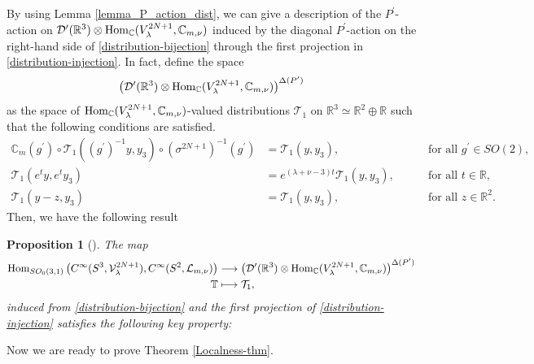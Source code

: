 \documentclass[12pt, pdflatex, a4paper]{article}
\theoremstyle{plain}
\newtheorem{prop}[thm]{Proposition}
\theoremstyle{definition}
\def\C{{\mathbb C}}
\def\Dist{\mathcal{D}^\prime}
\def\Hom{\text{\normalfont{Hom}}}
\def\L{\mathcal{L}}
\def\R{{\mathbb R}}
\def\V{\mathcal{V}}
\begin{document}
By using Lemma \ref{lemma_P_action_dist}, we can give a description of the $P^\prime$-action on $\Dist(\R^3)\otimes \Hom_\C(V_\lambda^{2N+1}, \C_{m, \nu})$ induced by the diagonal $P^\prime$-action on the right-hand side of \eqref{distribution-bijection} through the first projection in \eqref{distribution-injection}. In fact, define the space
\begin{equation*}
\left(\Dist(\R^3)\otimes \Hom_\C(V_\lambda^{2N+1}, \C_{m, \nu})\right)^{\Delta(P^\prime)}
\end{equation*}
as the space of $\Hom_\C(V_\lambda^{2N+1}, \C_{m, \nu})$-valued distributions $\mathcal{T}_1$ on $\R^3 \simeq \R^2 \oplus \R$ such that the following conditions are satisfied.
\begin{align}
\label{SO(2)-invariance}
\C_m(g^\prime) \circ \mathcal{T}_1((g^\prime)^{-1} y, y_3) \circ (\sigma^{2N+1})^{-1}(g^\prime) &=  \mathcal{T}_1(y, y_3), &&\quad \text{ for all } g^\prime \in SO(2),\\
\mathcal{T}_1(e^ty, e^ty_3) &= e^{(\lambda+\nu-3)t}\mathcal{T}_1(y,y_3), &&\quad \text{ for all } t\in \R,\\
\label{N_+'-invariance}
\mathcal{T}_1(y-z, y_3) & = \mathcal{T}_1(y, y_3), &&\quad \text{ for all } z\in \R^2.
\end{align}
Then, we have the following result
\begin{prop}[{\cite[Prop. 5.15]{KS18}}]\label{prop_dist_first}
The map 
\begin{align*}
\Hom_{SO_0(3,1)}\left(C^\infty(S^3, \V_\lambda^{2N+1}), C^\infty(S^2, \L_{m,\nu})\right) &\longrightarrow \left(\Dist(\R^3)\otimes \Hom_\C(V_\lambda^{2N+1}, \C_{m, \nu})\right)^{\Delta(P^\prime)}\\
\mathbb{T} &\longmapsto \mathcal{T}_1,
\end{align*}
induced from \eqref{distribution-bijection} and the first projection of \eqref{distribution-injection} satisfies the following key property:
\end{prop}

Now we are ready to prove Theorem \ref{Localness-thm}.
\end{document}
